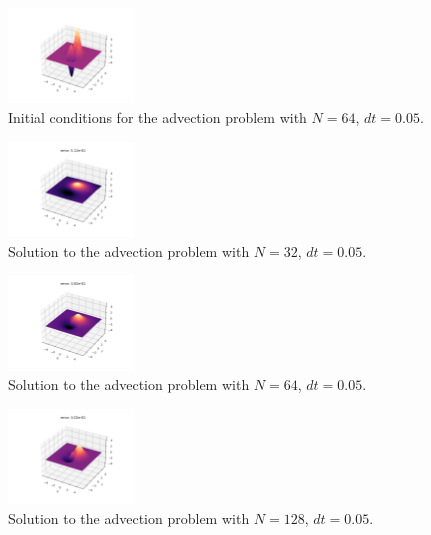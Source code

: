 \documentclass[acmtog]{acmart}
\begin{document}
\begin{figure}[H]
  \centering
  \includegraphics[width=0.3\textwidth]{Images/advection/exp1_I_64_start.png}
  \caption{Initial conditions for the advection problem with $N=64$, $dt = 0.05$.\label{fig:adv_exp1_start}}
\end{figure}
\begin{figure}[H]
  \centering
  \includegraphics[width=0.3\textwidth]{Images/advection/exp1_I_32_dt_0.005_fin.png}
  \caption{Solution to the advection problem with $N=32$, $dt = 0.05$.\label{fig:adv_exp1_solution1}}
\end{figure}
\begin{figure}[H]
  \centering
  \includegraphics[width=0.3\textwidth]{Images/advection/exp1_I_64_dt_0.005_fin.png}
  \caption{Solution to the advection problem with $N=64$, $dt = 0.05$.\label{fig:adv_exp1_solution2}}
\end{figure}
\begin{figure}[H]
  \centering
  \includegraphics[width=0.3\textwidth]{Images/advection/exp1_I_128_dt_0.005_fin.png}
  \caption{Solution to the advection problem with $N=128$, $dt = 0.05$.\label{fig:adv_exp1_solution3}}
\end{figure}
\end{document}
